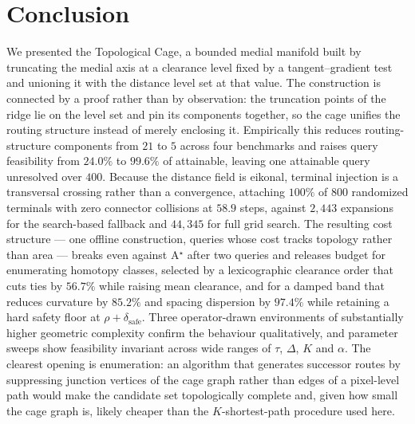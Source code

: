 \documentclass[conference]{IEEEtran}
\begin{document}
\section{Conclusion}
We presented the Topological Cage, a bounded medial manifold built by truncating the medial axis at a clearance level fixed by a tangent--gradient test and unioning it with the distance level set at that value. The construction is connected by a proof rather than by observation: the truncation points of the ridge lie on the level set and pin its components together, so the cage unifies the routing structure instead of merely enclosing it. Empirically this reduces routing-structure components from $21$ to $5$ across four benchmarks and raises query feasibility from $24.0\%$ to $99.6\%$ of attainable, leaving one attainable query unresolved over $400$. Because the distance field is eikonal, terminal injection is a transversal crossing rather than a convergence, attaching $100\%$ of $800$ randomized terminals with zero connector collisions at $58.9$ steps, against $2{,}443$ expansions for the search-based fallback and $44{,}345$ for full grid search. The resulting cost structure --- one offline construction, queries whose cost tracks topology rather than area --- breaks even against A$^\star$ after two queries and releases budget for enumerating homotopy classes, selected by a lexicographic clearance order that cuts ties by $56.7\%$ while raising mean clearance, and for a damped band that reduces curvature by $85.2\%$ and spacing dispersion by $97.4\%$ while retaining a hard safety floor at $\rho+\delta_{\mathrm{safe}}$. Three operator-drawn environments of substantially higher geometric complexity confirm the behaviour qualitatively, and parameter sweeps show feasibility invariant across wide ranges of $\tau$, $\Delta$, $K$ and $\alpha$. The clearest opening is enumeration: an algorithm that generates successor routes by suppressing junction vertices of the cage graph rather than edges of a pixel-level path would make the candidate set topologically complete and, given how small the cage graph is, likely cheaper than the $K$-shortest-path procedure used here.
\appendices
\end{document}
